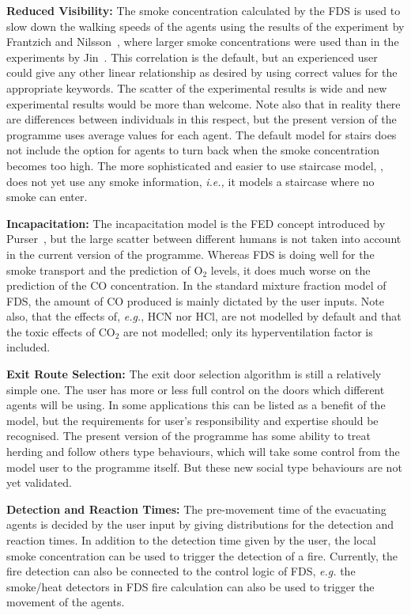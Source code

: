 \documentclass[12pt,a4paper,final,twoside]{stylevk}
\begin{document}
\textbf{Reduced Visibility:} The smoke concentration calculated by the
FDS is used to slow down the walking speeds of the agents using the
results of the experiment by Frantzich and Nilsson~\cite{Frantzich03},
where larger smoke concentrations were used than in the experiments by
Jin~\cite{Jin78}.  This correlation is the default, but an experienced
user could give any other linear relationship as desired by using
correct values for the appropriate keywords.  The scatter of the
experimental results is wide and new experimental results would be
more than welcome.  Note also that in reality there are differences
between individuals in this respect, but the present version of the
programme uses average values for each agent.  The default model for
stairs does not include the option for agents to turn back when the
smoke concentration becomes too high.  The more sophisticated and
easier to use staircase model, , does not yet use any
smoke information, \emph{i.e.,} it models a staircase where no smoke
can enter.


\textbf{Incapacitation:} The incapacitation model is the FED concept
introduced by Purser~\cite{Purser03}, but the large scatter between
different humans is not taken into account in the current version of
the programme.  Whereas FDS is doing well for the smoke transport and
the prediction of O${}_2$ levels, it does much worse on the prediction
of the CO concentration.  In the standard mixture fraction model of
FDS, the amount of CO produced is mainly dictated by the user inputs.
Note also, that the effects of, \emph{e.g.}, HCN nor HCl, are not
modelled by default and that the toxic effects of CO${}_2$ are not
modelled; only its hyperventilation factor is included.


\textbf{Exit Route Selection:} The exit door selection algorithm is
still a relatively simple one.  The user has more or less full control
on the doors which different agents will be using.  In some
applications this can be listed as a benefit of the model, but the
requirements for user's responsibility and expertise should be
recognised.  The present version of the programme has some ability to
treat herding and follow others type behaviours, which will take some
control from the model user to the programme itself.  But these new
social type behaviours are not yet validated.


\textbf{Detection and Reaction Times:} The pre-movement time of the
evacuating agents is decided by the user input by giving distributions
for the detection and reaction times.  In addition to the detection
time given by the user, the local smoke concentration can be used to
trigger the detection of a fire.  Currently, the fire detection can
also be connected to the control logic of FDS, \emph{e.g.}  the
smoke/heat detectors in FDS fire calculation can also be used to
trigger the movement of the agents.
\end{document}
